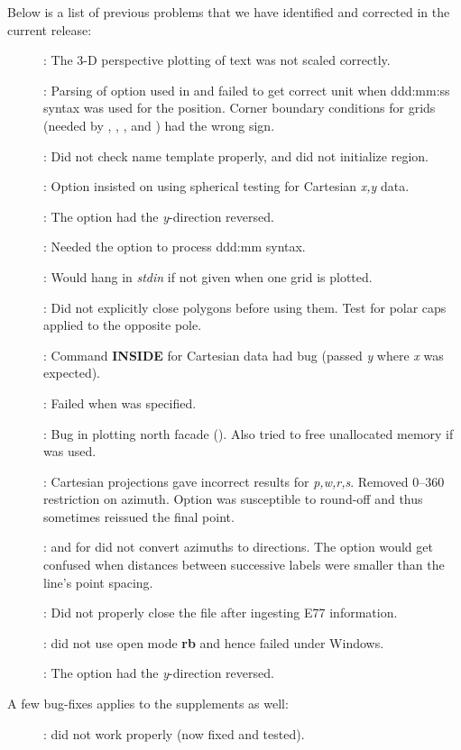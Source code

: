 Below is a list of previous problems
that we have identified and corrected in the current release:

\begin{description}
\item []: The 3-D perspective plotting of text was not scaled correctly.
\item []: Parsing of  option used in  and 
failed to get correct unit when ddd:mm:ss syntax was used for the position. Corner boundary conditions for grids (needed
by , , , and ) had the wrong sign.
\item []: Did not check name template properly, and did not initialize region.
\item []: Option  insisted on using spherical testing for Cartesian \emph{x,y} data.
\item []: The  option had the \emph{y}-direction reversed.
\item []: Needed the  option to process ddd:mm syntax.
\item []: Would hang in \emph{stdin} if  not given when one grid is plotted.
\item []: Did not explicitly close polygons before using them.  Test for polar caps applied to the opposite pole.
\item []: Command \textbf{INSIDE} for Cartesian data had bug (passed \emph{y} where \emph{x} was expected).
\item []: Failed when  was specified.
\item []: Bug in plotting north facade ().  Also tried to free unallocated memory if  was used.
\item []: Cartesian projections gave incorrect results for \emph{p,w,r,s}.
Removed 0--360 restriction on azimuth.  Option  was susceptible to round-off and thus
sometimes reissued the final point.
\item []:  and  for  did not convert azimuths to directions.
The  option would get confused when distances between successive labels were smaller than the line's point spacing.
\item []: Did not properly close the file after ingesting E77 information.
\item []:  did not use open mode \textbf{rb} and hence failed under Windows.
\item []: The  option had the \emph{y}-direction reversed.
\end{description}
A few bug-fixes applies to the supplements as well:
\begin{description}
\item []:  did not work properly (now fixed and tested).
\end{description}

